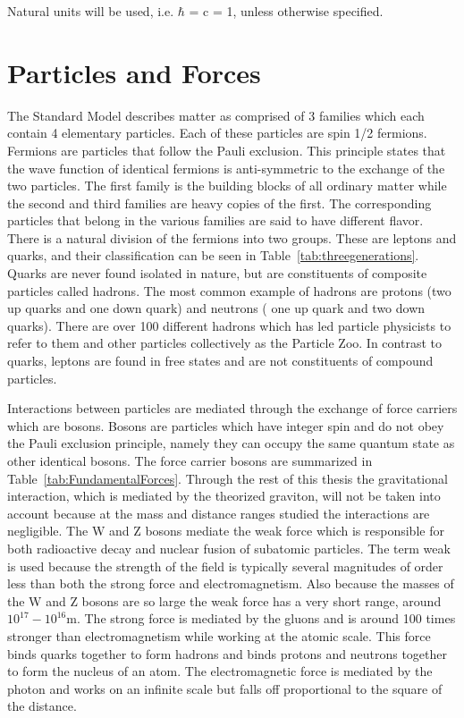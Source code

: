 Natural units will be used, i.e. $\hbar$ = c = 1, unless otherwise specified.


\section{Particles and Forces}

The Standard Model describes matter as comprised of 3 families which each contain 4 elementary particles.  Each of these particles are spin 1/2 fermions. Fermions are particles that follow the Pauli exclusion.  This principle states that the wave function of identical fermions is anti-symmetric to the exchange of the two particles\cite{Griffiths:2004}.  The first family is the building blocks of all ordinary matter while the second and third families are heavy copies of the first.  The corresponding particles that belong in the various families are said to have different flavor.  There is a natural division of the fermions into two groups.  These are leptons and quarks, and their classification can be seen in Table~\ref{tab:threegenerations}.  Quarks are never found isolated in nature, but are constituents of composite particles called hadrons.  The most common example of hadrons are protons (two up quarks and one down quark) and neutrons ( one up quark and two down quarks).  There are over 100 different hadrons which has led particle physicists to refer to them and other particles collectively as the Particle Zoo.  In contrast to quarks, leptons are found in free states and are not constituents of compound particles.

Interactions between particles are mediated through the exchange of force carriers which are bosons.  Bosons are particles which have integer spin and do not obey the Pauli exclusion principle, namely they can occupy the same quantum state as other identical bosons.  The force carrier bosons are summarized in Table~\ref{tab:FundamentalForces}.  Through the rest of this thesis the gravitational interaction, which is mediated by the theorized graviton, will not be taken into account because at the mass and distance ranges studied the interactions are negligible. The W and Z bosons mediate the weak force which is responsible for both radioactive decay and nuclear fusion of subatomic particles.  The term weak is used because the strength of the field is typically several magnitudes of order less than both the strong force and electromagnetism.  Also because the masses of the W and Z bosons are so large the weak force has a very short range, around $10^{17} - 10^{16}$m\cite{Christman:2001}.  The strong force is mediated by the gluons and is around 100 times stronger than electromagnetism while working at the atomic scale.  This force binds quarks together to form hadrons and binds protons and neutrons together to form the nucleus of an atom. The electromagnetic force is mediated by the photon and works on an infinite scale but falls off proportional to the square of the distance.  

